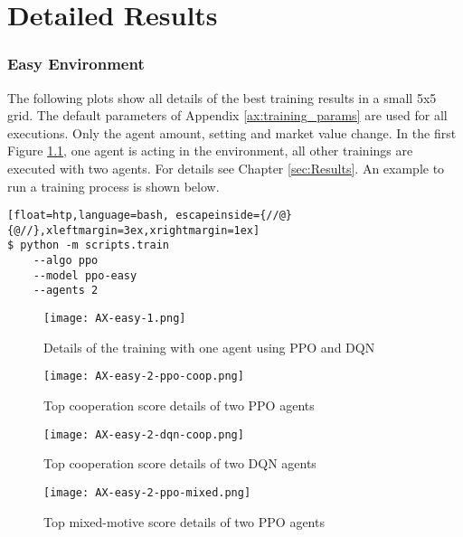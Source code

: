 \chapter{Detailed Results}\label{ax:plots}

\subsection{Easy Environment}
The following plots show all details of the best training results in a small 5x5 grid. The default parameters of Appendix \ref{ax:training_params} are used for all executions. Only the agent amount, setting and market value change. In the first Figure \ref{fig:ax-easy-1}, one agent is acting in the environment, all other trainings are executed with two agents. For details see Chapter \ref{sec:Results}. An example to run a training process is shown below.

\begin{lstlisting}[float=htp,language=bash, escapeinside={//@}{@//},xleftmargin=3ex,xrightmargin=1ex]
$ python -m scripts.train
    --algo ppo
    --model ppo-easy
    --agents 2
\end{lstlisting}

\newpage
\vfill
\begin{figure}
    \centering
    \texttt{[image: AX-easy-1.png]}\\
    \caption[PPO and DQN Training Details with One Agent]{Details of the training with one agent using PPO and DQN}\label{fig:ax-easy-1}
\end{figure}
\vfill
\clearpage


\newpage
\vfill
\begin{figure}
    \centering
    \texttt{[image: AX-easy-2-ppo-coop.png]}\\
    \caption[Training Details of Top PPO Cooperation Executions]{Top cooperation score details of two PPO agents}\label{fig:ax-easy-2-ppo-coop}
\end{figure}
\vfill
\clearpage


\newpage
\vfill
\begin{figure}
    \centering
    \texttt{[image: AX-easy-2-dqn-coop.png]}\\
    \caption[Training Details of Top DQN Cooperation Executions]{Top cooperation score details of two DQN agents}\label{fig:ax-easy-2-dqn-coop}
\end{figure}
\vfill
\clearpage


\newpage
\vfill
\begin{figure}
    \centering
    \texttt{[image: AX-easy-2-ppo-mixed.png]}\\
    \caption[Training Details of Top PPO Mixed-Motive Executions]{Top mixed-motive score details of two PPO agents}\label{fig:ax-easy-2-ppo-mixed}
\end{figure}
\vfill
\clearpage


